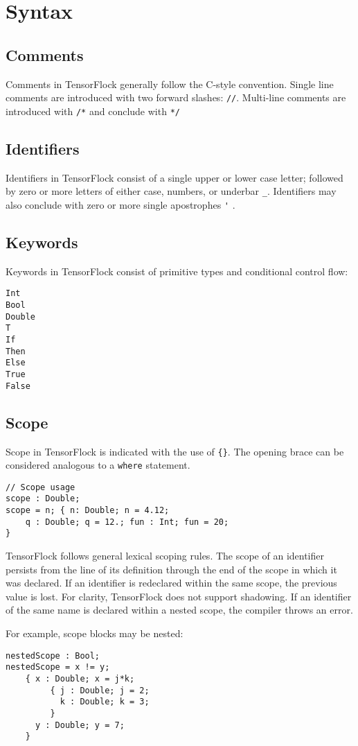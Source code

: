 \section{Syntax}%
\label{sec:syntax}
\subsection{Comments}
Comments in TensorFlock generally follow the C-style convention. Single line comments are introduced with two forward slashes: \lstinline|//|. Multi-line comments are introduced with \lstinline|/*| and conclude with \lstinline|*/|
\subsection{Identifiers}
Identifiers in TensorFlock consist of a single upper or lower case letter; followed by zero or more letters of either case, numbers, or underbar \lstinline|_|.  Identifiers may also conclude with zero or more single apostrophes \lstinline|'| .
\subsection{Keywords}
Keywords in TensorFlock consist of primitive types and conditional control flow:
\begin{lstlisting}
Int
Bool
Double
T
If
Then
Else
True
False
\end{lstlisting}
\subsection{Scope}
Scope in TensorFlock is indicated with the use of \lstinline|{}|. The opening brace can be considered analogous to a \lstinline|where| statement.
\begin{lstlisting}
// Scope usage
scope : Double;
scope = n; { n: Double; n = 4.12;
    q : Double; q = 12.; fun : Int; fun = 20;
}
\end{lstlisting}
TensorFlock follows general lexical scoping rules.  The scope of an identifier persists from the line of its definition through the end of the scope in which it was declared. If an identifier is redeclared within the same scope, the previous value is lost. For clarity, TensorFlock does not support shadowing. If an identifier of the same name is declared within a nested scope, the compiler throws an error.

For example, scope blocks may be nested:
\begin{lstlisting}
nestedScope : Bool;
nestedScope = x != y;
    { x : Double; x = j*k;
         { j : Double; j = 2;
           k : Double; k = 3;
         }
      y : Double; y = 7;
    }    
\end{lstlisting}

